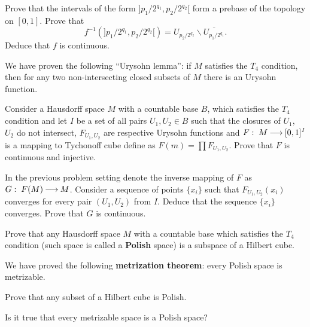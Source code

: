\documentclass[12pt]{article}
\begin{document}
\begin{ukazanie} 
Prove that the intervals of the form $]p_1/2^{q_1}, p_2/2^{q_2}[$ form
a prebase of the topology on $[0,1]$. Prove that 
\[ 
   f^{-1}(]p_1/2^{q_1}, p_2/2^{q_2}[) =
   U_{p_2/2^{q_2}}\backslash \overline{U_{p_1/2^{q_1}}}.
\]
Deduce that $f$ is continuous.
\end{ukazanie}

\begin{zamechanie}
We have proven the following ``Urysohn lemma'': if $M$ satisfies the 
$T_4$ condition, then for any two non-intersecting closed subsets of 
$M$ there is an Urysohn function.
\end{zamechanie}

\begin{zadacha}[*]
Consider a Hausdorff space $M$ with a countable base $B$,
which satisfies the $T_4$ condition and let $I$ be a set of all pairs
$U_1, U_2 \in B$ such that the closures of $U_1$, $U_2$ do not
intersect, $F_{U_1, U_2}$ are respective Urysohn functions and $F:\; M
{\:\longrightarrow\:} [0,1]^I$ is a mapping to Tychonoff cube define as $F(m) = \prod
F_{U_1, U_2}$.  Prove that $F$ is continuous and injective.
\end{zadacha}

\begin{zadacha}[*]
In the previous problem setting denote the inverse mapping of $F$ as
$G:\; F(M) {\:\longrightarrow\:} M$. Consider a sequence of points 
$\{x_i\}$ such that $F_{U_1, U_2}(x_i)$ converges for every pair
$(U_1, U_2)$ from $I$. Deduce that the sequence 
$\{x_i\}$ converges. Prove that $G$ is continuous.
\end{zadacha}

\begin{zadacha}[*]
  Prove that any Hausdorff space $M$ with a countable base which
  satisfies the $T_4$ condition (such space is called a {\bf Polish}
  space) is a subspace of a Hilbert cube.
\end{zadacha}

\begin{zamechanie}
We have proved the following {\bf metrization theorem}:
every Polish space is metrizable.
\end{zamechanie}

\begin{zadacha} 
Prove that any subset of a Hilbert cube is Polish.
\end{zadacha}

\begin{zadacha}[*]
Is it true that every metrizable space is a Polish space?
\end{zadacha}
\end{document}
